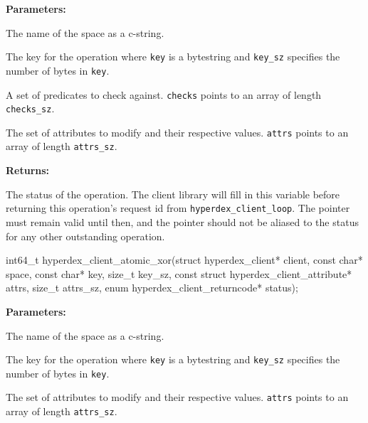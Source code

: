 \noindent\textbf{Parameters:}
\begin{description}[labelindent=\widthof{{\texttt{checks}, \texttt{checks\_sz}}},leftmargin=*,noitemsep,nolistsep,align=right]
\item[\texttt{space}] The name of the space as a c-string.
\item[\texttt{key}, \texttt{key\_sz}] The key for the operation where \texttt{key} is a bytestring and \texttt{key\_sz} specifies the number of bytes in \texttt{key}.
\item[\texttt{checks}, \texttt{checks\_sz}] A set of predicates to check against.  \texttt{checks} points to an array of length \texttt{checks\_sz}.
\item[\texttt{attrs}, \texttt{attrs\_sz}] The set of attributes to modify and their respective values.  \texttt{attrs} points to an array of length \texttt{attrs\_sz}.
\end{description}

\noindent\textbf{Returns:}
\begin{description}[labelindent=\widthof{{\texttt{status}}},leftmargin=*,noitemsep,nolistsep,align=right]
\item[\texttt{status}] The status of the operation.  The client library will fill in this variable before returning this operation's request id from \texttt{hyperdex\_client\_loop}.  The pointer must remain valid until then, and the pointer should not be aliased to the status for any other outstanding operation.
\end{description}

\funcsep
{}
\begin{ccode}
int64_t hyperdex_client_atomic_xor(struct hyperdex_client* client,
                const char* space,
                const char* key, size_t key_sz,
                const struct hyperdex_client_attribute* attrs, size_t attrs_sz,
                enum hyperdex_client_returncode* status);
\end{ccode}
\funcdesc 

\noindent\textbf{Parameters:}
\begin{description}[labelindent=\widthof{{\texttt{attrs}, \texttt{attrs\_sz}}},leftmargin=*,noitemsep,nolistsep,align=right]
\item[\texttt{space}] The name of the space as a c-string.
\item[\texttt{key}, \texttt{key\_sz}] The key for the operation where \texttt{key} is a bytestring and \texttt{key\_sz} specifies the number of bytes in \texttt{key}.
\item[\texttt{attrs}, \texttt{attrs\_sz}] The set of attributes to modify and their respective values.  \texttt{attrs} points to an array of length \texttt{attrs\_sz}.
\end{description}

